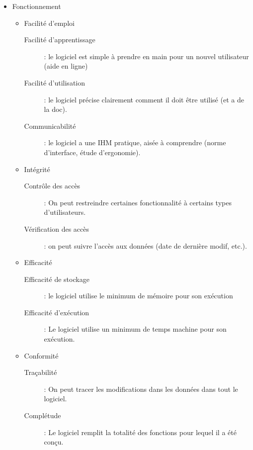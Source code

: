 \begin{itemize}

\item Fonctionnement
	\begin{itemize}

	\item Facilité d'emploi
		\begin{description}	
		\item[Facilité d'apprentissage] : le logiciel est simple à prendre en main pour un nouvel utilisateur (aide en ligne)		
		\item[Facilité d'utilisation] : le logiciel précise clairement comment il doit être utilisé (et a de la doc).
		\item[Communicabilité] : le logiciel a une IHM pratique, aisée à comprendre (norme d'interface, étude d'ergonomie).
		\end{description}

	\item Intégrité
		\begin{description}	
		\item[Contrôle des accès] : On peut restreindre certaines 	fonctionnalité à certains types d'utilisateurs.			
		\item[Vérification des accès] : on peut suivre l'accès aux données (date de dernière modif, etc.).
		\end{description}

	\item Efficacité
		\begin{description}	
		\item[Efficacité de stockage] : le logiciel utilise le minimum de mémoire pour son exécution			
		\item[Efficacité d'exécution] : Le logiciel utilise un minimum de temps machine pour son exécution.
		\end{description}

	\item Conformité
		\begin{description}	
		\item[Traçabilité] : On peut tracer les modifications dans les données dans tout le logiciel.		
		\item[Complétude] : Le logiciel remplit la totalité des fonctions pour lequel il a été conçu.
		\end{description}


\end{itemize}
\end{itemize}
